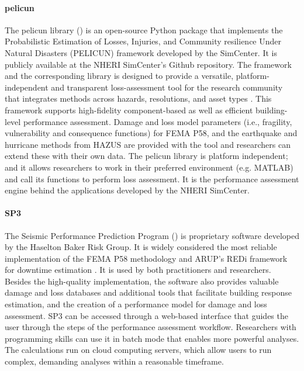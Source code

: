 \paragraph{pelicun} The pelicun library () is an open-source Python package that implements the Probabilistic Estimation of Losses, Injuries, and Community resilience Under Natural Disasters (PELICUN) framework developed by the SimCenter. It is publicly available at the NHERI SimCenter's Github repository. The framework and the corresponding library is designed to provide a versatile, platform-independent and transparent loss-assessment tool for the research community that integrates methods across hazards, resolutions, and asset types \citep{zsarnoczay2020pelicun}. This framework supports high-fidelity component-based as well as efficient building-level performance assessment. Damage and loss model parameters (i.e., fragility, vulnerability and consequence functions) for FEMA P58, and the earthquake and hurricane methods from HAZUS are provided with the tool and researchers can extend these with their own data. The pelicun library is platform independent; and it allows researchers to work in their preferred environment (e.g. MATLAB) and call its functions to perform loss assessment. It is the performance assessment engine behind the applications developed by the NHERI SimCenter.

\paragraph{SP3} The Seismic Performance Prediction Program () is proprietary software developed by the Haselton Baker Risk Group. It is widely considered the most reliable implementation of the FEMA P58 methodology and ARUP's REDi framework for downtime estimation \citep{arup2013resiliencebased}. It is used by both practitioners and researchers. Besides the high-quality implementation, the software also provides valuable damage and loss databases and additional tools that facilitate building response estimation, and the creation of a performance model for damage and loss assessment. SP3 can be accessed through a web-based interface that guides the user through the steps of the performance assessment workflow. Researchers with programming skills can use it in batch mode that enables more powerful analyses. The calculations run on cloud computing servers, which allow users to run complex, demanding analyses within a reasonable timeframe.

